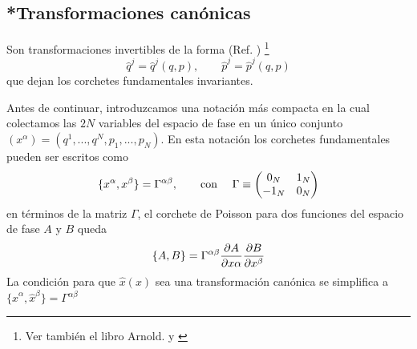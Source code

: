 \subsection{*Transformaciones canónicas}
Son transformaciones invertibles de la forma (Ref. \cite{Schwichtenberg:2018dri}) \footnote{Ver también el libro Arnold. y \cite{book:1007830} }
\begin{equation}
  \hat{q}^j=\hat{q}^j(q,p),\qquad \hat{p}^j=\hat{p}^j(q,p)
\end{equation}
que dejan los corchetes fundamentales invariantes.

Antes de continuar, introduzcamos una notación más compacta en la cual colectamos las $2N$ variables del espacio de fase en un único conjunto $(x^\alpha)=(q^1,...,q^N,p_1,...,p_N)$. En esta notación los corchetes fundamentales pueden ser escritos como
\begin{equation}
  \{x^\alpha,x^\beta\}=\Gamma^{\alpha \beta},\qquad \mbox{con }\quad \Gamma\equiv \mqty(0_N&1_N\\-1_N&0_N)
\end{equation}
en términos de la matriz $\Gamma$, el corchete de Poisson para dos funciones del espacio de fase $A$ y $B$ queda
\begin{equation}
  \{A,B\}=\Gamma^{\alpha \beta}\pdv{A}{x\alpha}\pdv{B}{x^\beta}
\end{equation}
La condición para que $\hat{x}(x)$ sea una transformación canónica se simplifica a $\{\hat{x}^\alpha,\hat{x}^\beta\}=\Gamma^{\alpha \beta}$























































